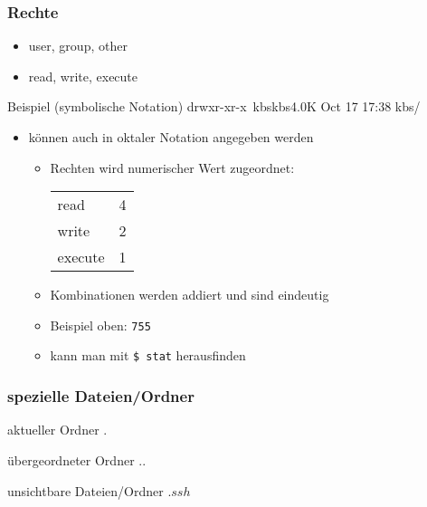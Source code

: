 \documentclass{beamer}
\begin{document}
    \begin{frame}
        \frametitle{Rechte}
        \begin{itemize}
            \item user, group, other
            \item read, write, execute
        \end{itemize}
        \begin{block}{Beispiel (symbolische Notation)}
            drwxr-xr-x\ kbs\qquad kbs\qquad 4.0K Oct 17 17:38 kbs/
        \end{block}
        \begin{itemize}
          \item können auch in oktaler Notation angegeben werden
          \begin{itemize}
            \item Rechten wird numerischer Wert zugeordnet:\\
            \begin{tabular}{ll}
              read & 4\\
              write & 2\\
              execute & 1
            \end{tabular}
            \item Kombinationen werden addiert und sind eindeutig
            \item Beispiel oben: \texttt{755}
            \item kann man mit \texttt{\$ stat} herausfinden
          \end{itemize}
        \end{itemize}
    \end{frame}

    \begin{frame}
        \frametitle{spezielle Dateien/Ordner}
        \begin{block}{aktueller Ordner}
            $.$
        \end{block}
        \begin{block}{übergeordneter Ordner}
            $..$
        \end{block}
        \begin{block}{unsichtbare Dateien/Ordner}
            $.ssh$
        \end{block}
    \end{frame}
\end{document}
